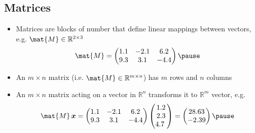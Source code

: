 
\begin{slide}
\section{Matrices}

\begin{PauseHighLight}
  \begin{itemize}
  \item Matrices are blocks of number that define linear mappings
    between vectors, e.g. $\mat{M} \in \mathbb{R}^{2\times3}$ 
    \begin{align*}
      \mat{M} =
      \begin{pmatrix}
        1.1 & -2.1 & 6.2 \\ 9.3 & 3.1 &-4.4
      \end{pmatrix}\pause
    \end{align*}
  \item An $m\times n$ matrix (i.e. $\mat{M} \in \mathbb{R}^{m\times
      n}$) has $m$ rows and $n$ columns\pause
  \item An $m \times n$ matrix acting on a vector in $\mathbb{R}^n$
    transforms it to $\mathbb{R}^m$ vector, e.g.
    \begin{align*}
      \mat{M} \, \bm{x} =
      \begin{pmatrix}
        1.1 & -2.1 & 6.2 \\ 9.3 & 3.1 &-4.4
      \end{pmatrix}
      \begin{pmatrix}
        1.2 \\ 2.3 \\ 4.7\
      \end{pmatrix}
      =
      \begin{pmatrix}
        28.63 \\ -2.39
      \end{pmatrix}\pause
      \end{align*}
  \end{itemize}
\end{PauseHighLight}

\end{slide}


